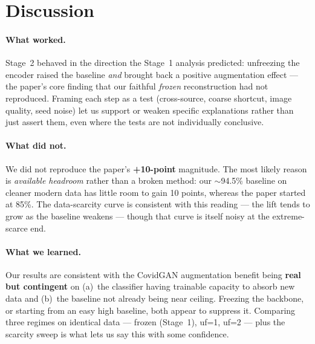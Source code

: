 \documentclass[11pt]{article}
\begin{document}
\section{Discussion}
\label{sec:discussion}

\paragraph{What worked.} Stage~2 behaved in the direction the Stage~1 analysis
predicted: unfreezing the encoder raised the baseline \emph{and} brought back a
positive augmentation effect --- the paper's core finding that our faithful
\emph{frozen} reconstruction had not reproduced. Framing each step as a test
(cross-source, coarse shortcut, image quality, seed noise) let us support or weaken
specific explanations rather than just assert them, even where the tests are not
individually conclusive.

\paragraph{What did not.} We did not reproduce the paper's \textbf{+10-point}
magnitude. The most likely reason is \emph{available headroom} rather than a broken
method: our $\sim$94.5\% baseline on cleaner modern data has little room to gain 10
points, whereas the paper started at 85\%. The data-scarcity curve is consistent
with this reading --- the lift tends to grow as the baseline weakens --- though
that curve is itself noisy at the extreme-scarce end.

\paragraph{What we learned.} Our results are consistent with the CovidGAN
augmentation benefit being \textbf{real but contingent} on (a)~the classifier
having trainable capacity to absorb new data and (b)~the baseline not already being
near ceiling. Freezing the backbone, or starting from an easy high baseline, both
appear to suppress it. Comparing three regimes on identical data --- frozen
(Stage~1), uf=1, uf=2 --- plus the scarcity sweep is what lets us say this with
some confidence.
\end{document}
